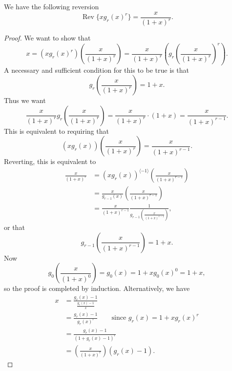 \documentclass[10pt,a4paper]{amsart}
\DeclareMathOperator{\Rev}{Rev}
\begin{document}
\begin{proposition} We have the following reversion
$$\Rev\{xg_r(x)^r\}=\frac{x}{(1+x)^r}.$$
\end{proposition}

\begin{proof}
We want to show that
$$x=(xg_r(x)^r)\left(\frac{x}{(1+x)^r}\right)=\frac{x}{(1+x)^r}\left(g_r\left(\frac{x}{(1+x)^r}\right)^r\right).$$ A necessary and sufficient condition for this to be true is that
$$g_r\left(\frac{x}{(1+x)^r}\right)=1+x.$$
Thus we want
$$\frac{x}{(1+x)^r}g_r\left(\frac{x}{(1+x)^r}\right)=\frac{x}{(1+x)^r} \cdot (1+x)=\frac{x}{(1+x)^{r-1}}.$$
This is equivalent to requiring that
$$(xg_r(x))\left(\frac{x}{(1+x)^r}\right)=\frac{x}{(1+x)^{r-1}}.$$ Reverting, this is equivalent to
\begin{align*}\frac{x}{(1+x)^r}&=(x g_r(x))^{\langle -1 \rangle}\left(\frac{x}{(1+x)^{r-1}}\right)\\
&=\frac{x}{g_{r-1}(x)}\left(\frac{x}{(1+x)^{r-1}}\right)\\
&=\frac{x}{(1+x)^{r-1}}\frac{1}{g_{r-1}\left(\frac{x}{(1+x)^{r-1}}\right)},\end{align*} or that
$$g_{r-1}\left(\frac{x}{(1+x)^{r-1}}\right)=1+x.$$
Now $$g_0\left(\frac{x}{(1+x)^0}\right)=g_0(x)=1+x g_0(x)^0=1+x,$$ so the proof is completed by induction.
Alternatively, we have 
\begin{align*}
x&=\frac{g_r(x)-1}{\frac{g_r(x)-1}{x}}\\
&=\frac{g_r(x)-1}{g_r(x)^r}\quad\quad \text{since $g_r(x)=1+x g_r(x)^r$}\\
&=\frac{g_r(x)-1}{(1+g_r(x)-1)^r}\\
&= \left(\frac{x}{(1+x)^r}\right)(g_r(x)-1).\end{align*}
\end{proof}
\end{document}
